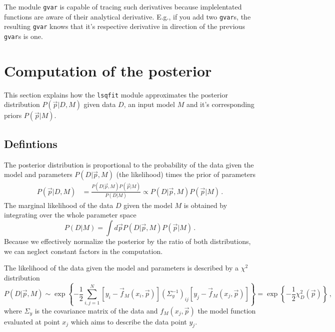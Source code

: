 \documentclass[paper=a4, fontsize=12pt, prl, notitlepage]{revtex4-1}
\begin{document}
The module \texttt{gvar} is capable of tracing such derivatives because implelentated functions are aware of their analytical derivative.
E.g., if you add two \texttt{gvar}s, the resulting \texttt{gvar} knows that it's respective derivative in direction of the previous \texttt{gvar}s is one.




\section{Computation of the posterior}

This section explains how the \texttt{lsqfit} module approximates the posterior distribution $P(\vec p|D,M)$ given data $D$, an input model $M$ and it's corresponding priors $P(\vec p| M)$.

\subsection{Defintions}

The posterior distribution is proportional to the probability of the data given the model and parameters $P(D|\vec p, M)$ (the likelihood) times the prior of parameters
\begin{align}
    P(\vec p|D, M) &=
    \frac{P(D|\vec p, M)P(\vec p | M)}{P(D|M)}
    \propto
    P(D|\vec p, M)P(\vec p | M)
    \, .
\end{align}
The marginal likelihood of the data $D$ given the model $M$ is obtained by integrating over the whole parameter space
\begin{equation}
	P(D|M)
	=
	\int d \vec p P(D|\vec p, M)P(\vec p | M) \, .
\end{equation}
Because we effectively normalize the posterior by the ratio of both distributions, we can neglect constant factors in the computation.

The likelihood of the data given the model and parameters is described by a $\chi^2$ distribution
\begin{equation}
    P(D|\vec p, M)
    \sim
    \exp\left\{
        - \frac{1}{2}
        \sum_{i,j=1}^N
        \left[y_i - \vec f_M(x_i, \vec p)\right]
        \left(\Sigma_y^{-1}\right)_{ij}
        \left[y_j - \vec f_M(x_j, \vec p)\right]
    \right\}
    =
    \exp\left\{
        - \frac{1}{2}
        \chi^2_D(\vec p)
    \right\}
    \, ,
\end{equation}
where $\Sigma_y$ is the covariance matrix of the data and $f_M(x_j, \vec p)$ the model function evaluated at point $x_j$ which aims to describe the data point $y_j$.
\end{document}
